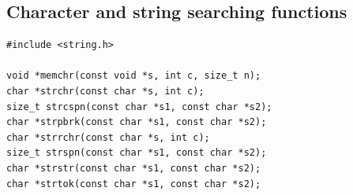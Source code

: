   

  \subsection{Character and string searching functions}
   

   \begin{Verbatim}
#include <string.h>

void *memchr(const void *s, int c, size_t n);
char *strchr(const char *s, int c);
size_t strcspn(const char *s1, const char *s2);
char *strpbrk(const char *s1, const char *s2);
char *strrchr(const char *s, int c);
size_t strspn(const char *s1, const char *s2);
char *strstr(const char *s1, const char *s2);
char *strtok(const char *s1, const char *s2);
\end{Verbatim}

